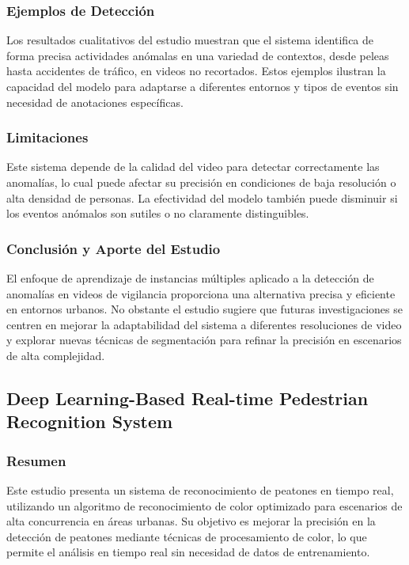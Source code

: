 \subsubsection{Ejemplos de Detección}
Los resultados cualitativos del estudio muestran que el sistema identifica de forma precisa actividades anómalas en una variedad de contextos, desde peleas hasta accidentes de tráfico, en videos no recortados. Estos ejemplos ilustran la capacidad del modelo para adaptarse a diferentes entornos y tipos de eventos sin necesidad de anotaciones específicas.

\subsubsection{Limitaciones}
Este sistema depende de la calidad del video para detectar correctamente las anomalías, lo cual puede afectar su precisión en condiciones de baja resolución o alta densidad de personas. La efectividad del modelo también puede disminuir si los eventos anómalos son sutiles o no claramente distinguibles.

\subsubsection{Conclusión y Aporte del Estudio}
El enfoque de aprendizaje de instancias múltiples aplicado a la detección de anomalías en videos de vigilancia proporciona una alternativa precisa y eficiente en entornos urbanos. No obstante el estudio sugiere que futuras investigaciones se centren en mejorar la adaptabilidad del sistema a diferentes resoluciones de video y explorar nuevas técnicas de segmentación para refinar la precisión en escenarios de alta complejidad.


\subsection{Deep Learning-Based Real-time Pedestrian Recognition System}

\subsubsection{Resumen}
Este estudio presenta un sistema de reconocimiento de peatones en tiempo real, utilizando un algoritmo de reconocimiento de color optimizado para escenarios de alta concurrencia en áreas urbanas. Su objetivo es mejorar la precisión en la detección de peatones mediante técnicas de procesamiento de color, lo que permite el análisis en tiempo real sin necesidad de datos de entrenamiento.

